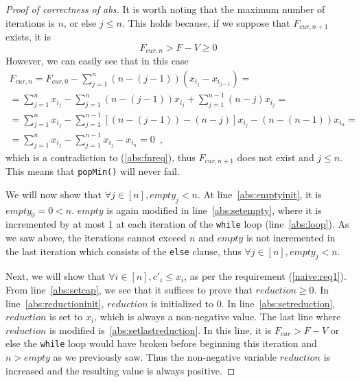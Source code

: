 \begin{proof}[Proof of correctness of abs]
  It is worth noting that the maximum number of iterations is $n$, or else $j \leq n$. This holds because, if we suppose that
  $F_{cur, n+1}$ exists, it is
  \begin{equation}
  \label{abs:fnreq}
    F_{cur, n} > F - V \geq 0
  \end{equation}
  However, we can easily see that in this case
  \begin{equation*}
  \begin{gathered}
    F_{cur, n} = F_{cur, 0} - \sum\limits_{j=1}^n(n - (j-1))(x_{i_j} - x_{i_{j-1}}) = \\
    = \sum\limits_{j=1}^nx_{i_j} - \sum\limits_{j=1}^n(n - (j - 1))x_{i_j} + \sum\limits_{j=1}^{n-1}(n - j)x_{i_j} = \\
    = \sum\limits_{j=1}^nx_{i_j} - \sum\limits_{j=1}^{n-1}[(n - (j - 1)) - (n - j)]x_{i_j} - (n - (n - 1))x_{i_n} = \\
    = \sum\limits_{j=1}^nx_{i_j} - \sum\limits_{j=1}^{n-1}x_{i_j} - x_{i_n} = 0\enspace,
  \end{gathered}
  \end{equation*}
  which is a contradiction to (\ref{abs:fnreq}), thus $F_{cur, n+1}$ does not exist and $j \leq n$. This means that
  \texttt{popMin()} will never fail.

  We will now show that $\forall j \in [n], empty_j < n$. At line~\ref{abs:emptyinit}, it is $empty_0 = 0 < n$. $empty$
  is again modified in line~\ref{abs:setempty}, where it is incremented by at most 1 at each iteration of the \texttt{while}
  loop (line~\ref{abs:loop}). As we saw above, the iterations cannot exceed $n$ and $empty$ is not incremented in the last
  iteration which consists of the \texttt{else} clause, thus $\forall j \in [n], empty_j < n$.

  Next, we will show that $\forall i \in [n], c'_i \leq x_i$, as per the requirement (\ref{naive:req1}). From
  line~\ref{abs:setcap}, we see that it suffices to prove that $reduction \geq 0$. In line~\ref{abs:reductioninit},
  $reduction$ is initialized to 0. In line~\ref{abs:setreduction}, $reduction$ is set to $x_i$, which is always
  a non-negative value. The last line where $reduction$ is modified is~\ref{abs:setlastreduction}. In this line, it is
  $F_{cur} > F - V$ or else the \texttt{while} loop would have broken before beginning this iteration and $n > empty$ as we
  previously saw. Thus the non-negative variable $reduction$ is increased and the resulting value is always positive.


\end{proof}
